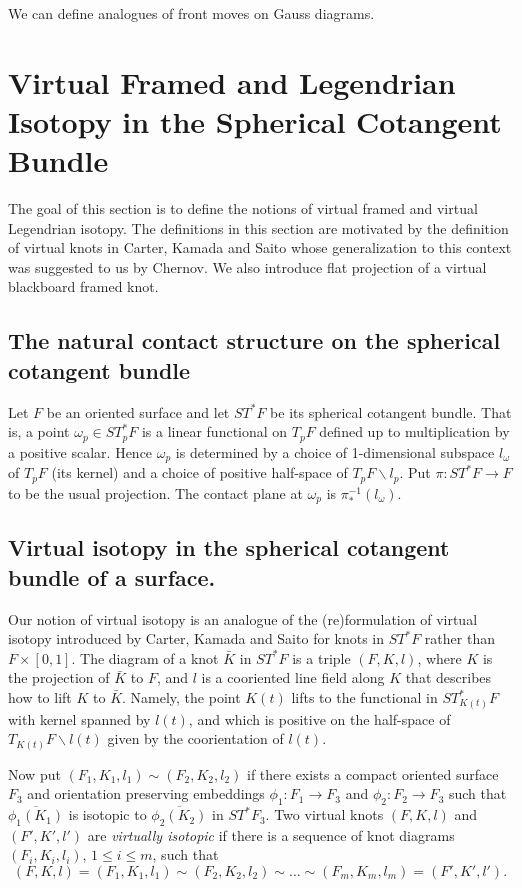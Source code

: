 We can define analogues of front moves on Gauss diagrams. 


\section{Virtual Framed and Legendrian Isotopy in the Spherical Cotangent Bundle}
The goal of this section is to define the notions of virtual framed and virtual Legendrian isotopy.  The definitions in this section are motivated by the definition of virtual knots in Carter, Kamada and Saito \cite{CKS} whose generalization to this context was suggested to us by Chernov.  We also introduce flat projection of a virtual blackboard framed knot. 


\subsection{The natural contact structure on the spherical cotangent bundle} \label{defSTF}
Let $F$ be an oriented surface and let $ST^*F$ be its spherical cotangent bundle.  That is, a point $\omega_p\in ST_p^*F$ is a linear functional on $T_pF$ defined up to multiplication by a positive scalar.  Hence $\omega_p$ is determined by a choice of 1-dimensional subspace $l_\omega$ of $T_pF$ (its kernel) and a choice of positive half-space of $T_pF\backslash l_p$.  Put $\pi: ST^*F\rightarrow F$ to be the usual projection.  The contact plane at $\omega_p$ is $\pi_*^{-1}(l_\omega)$. 


\subsection{Virtual isotopy in the spherical cotangent bundle of a surface.}
Our notion of virtual isotopy is an analogue of the (re)formulation of virtual isotopy introduced by Carter, Kamada and Saito \cite{CKS} for knots in $ST^*F$ rather than $F\times [0,1]$. The diagram of a knot $\bar{K}$ in $ST^*F$ is a triple $(F,K,l)$, where $K$ is the projection of $\bar{K}$ to $F$, and $l$ is a cooriented line field along $K$ that describes how to lift $K$ to $\bar{K}$.  Namely, the point $K(t)$ lifts to the functional in $ST_{K(t)}^*F$ with kernel spanned by $l(t)$, and which is positive on the half-space of $T_{K(t)}F\backslash l(t)$ given by the coorientation of $l(t)$.

Now put $(F_1, K_1,l_1) \sim (F_2,K_2,l_2)$ if there exists a compact oriented surface $F_3$ and orientation preserving embeddings $\phi_1: F_1\rightarrow F_3$ and $\phi_2: F_2\rightarrow F_3$ such that $\overline{\phi_1(K_1)}$ is isotopic to $\overline{\phi_2(K_2)}$ in $ST^*F_3$.  Two virtual knots $(F,K,l)$ and $(F',K',l')$ are {\it virtually isotopic} if there  is a sequence of knot diagrams $(F_i,K_i,l_i)$, $1\leq i \leq m$, such that 
$$(F,K,l)=(F_1,K_1,l_1)\sim (F_2,K_2,l_2) \sim \dots \sim (F_m,K_m,l_m)=(F',K',l').$$


